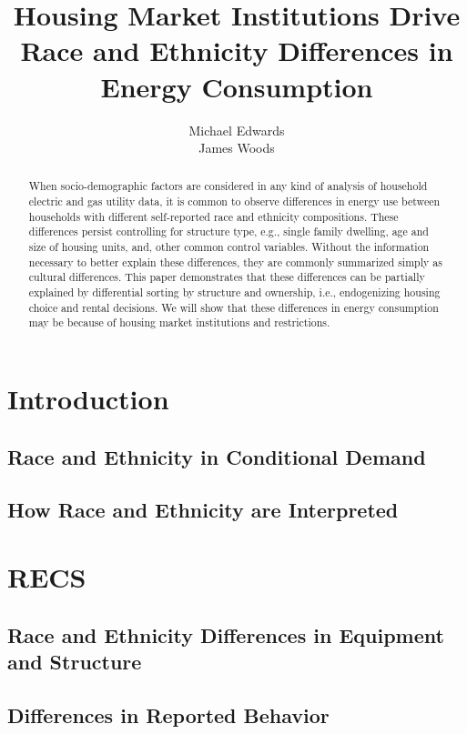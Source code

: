 \documentclass{article}
\author{Michael Edwards\\ 
  James Woods}
\title{Housing Market Institutions Drive Race and Ethnicity Differences in Energy Consumption}
\begin{document}
\maketitle


\begin{abstract}

When socio-demographic factors are considered in any kind of analysis of household electric and gas utility data, it is common to observe differences in energy use between households with different self-reported race and ethnicity compositions. These differences persist controlling for structure type, e.g., single family dwelling, age and size of housing units, and, other common control variables. Without the information necessary to better explain these differences, they are commonly summarized simply as cultural differences. This paper demonstrates that these differences can be partially explained by differential sorting by structure and ownership, i.e., endogenizing housing choice and rental decisions. We will show that these differences in energy consumption may be because of housing market institutions and restrictions.
\end{abstract}

\section{Introduction}

\cite{RBase}




  \subsection{Race and Ethnicity in Conditional Demand}
  \subsection{How Race and Ethnicity are Interpreted}

\section{RECS}

  \subsection{Race and Ethnicity Differences in Equipment and Structure}
  \subsection{Differences in Reported Behavior}
\end{document}
